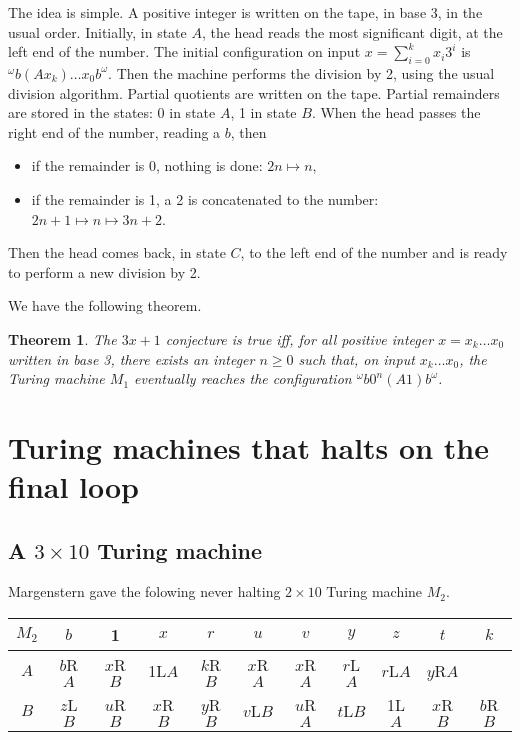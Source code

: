 \documentclass[10pt]{article}
\newtheorem{thm}[prop]{Theorem}
\begin{document}
The idea is simple. A positive integer is written on the tape, in base 3, in the usual order.
Initially, in state $A$, the head reads the most significant digit, at the left end
of the number. The initial configuration on input $x = \sum_{i=0}^k x_i3^i$ is
$^\omega b(Ax_k)\ldots x_0b^\omega$. Then the machine performs the division by 2, using the usual
division algorithm. Partial quotients are written on the tape. Partial remainders
are stored in the states: 0 in state $A$, 1 in state $B$. When the head passes the right
end of the number, reading a $b$, then
\begin{itemize}
\item if the remainder is 0, nothing is done: $2n \mapsto n$,
\item if the remainder is 1, a 2 is concatenated to the number:
$2n + 1 \mapsto n \mapsto 3n + 2$.
\end{itemize}
Then the head comes back, in state $C$, to the left end of the number and is
ready to perform a new division by 2.

We have the following theorem.
\begin{thm}
The $3x + 1$ conjecture is true iff, for all positive integer
$x = x_k\ldots x_0$ written in base 3, there exists an integer
$n \ge 0$ such that, on input $x_k\ldots x_0$, the Turing machine
$M_1$ eventually reaches the configuration ${^\omega}b0^n(A1)b^\omega$.
\end{thm}

\section{Turing machines that halts on the final loop}
\subsection{A $3 \times 10$ Turing machine}
Margenstern \cite[Fig.\ 11]{Ma00} gave the folowing never halting $2 \times 10$
Turing machine $M_2$.

\begin{center}
\begin{tabular}{|c|c|c|c|c|c|c|c|c|c|c|}
\hline
$M_2$ &  $b$  &    1    &   $x$   &   $r$   &   $u$   
    &  $v$  &    $y$    &   $z$   &   $t$   &   $k$   \\
\hline
$A$ & $b$R$A$ & $x$R$B$ &  1L$A$  & $k$R$B$ & $x$R$A$ 
& $x$R$A$ & $r$L$A$ & $r$L$A$ & $y$R$A$ &         \\
\hline
$B$ & $z$L$B$ & $u$R$B$ & $x$R$B$ & $y$R$B$ & $v$L$B$ 
& $u$R$A$ & $t$L$B$ &  1L$A$  & $x$R$B$ & $b$R$B$ \\
\hline
\end{tabular}
\end{center}
\end{document}
